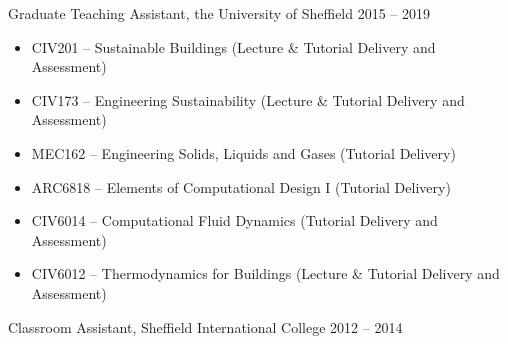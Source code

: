 \documentclass[10pt]{article}
\renewcommand{\section}[1]{\pagebreak[3]%
    \vspace{1.3\baselineskip}%
    \phantomsection\addcontentsline{toc}{section}{#1}%
    \noindent\llap{\large\smash{\parbox[t]{\marginparwidth}{\raggedright #1}}}%
    \vspace{-\baselineskip}\par}
\newenvironment{innerlist}[1][\enskip\textbullet]%
        {\begin{itemize}[#1,leftmargin=*,parsep=0pt,itemsep=0pt,topsep=0pt,partopsep=0pt]}
        {\end{itemize}}
\newcommand{\blankline}{\quad\pagebreak[3]}
\begin{document}
Graduate Teaching Assistant, the University of Sheffield \hfill {2015 -- 2019}
\begin{innerlist}[topsep=0ex]
	\item[] CIV201 -- Sustainable Buildings (Lecture \& Tutorial Delivery and Assessment)
	\item[] CIV173 -- Engineering Sustainability (Lecture \& Tutorial Delivery and Assessment)
	\item[] MEC162 -- Engineering Solids, Liquids and Gases (Tutorial Delivery)
	\item[] ARC6818 -- Elements of Computational Design I (Tutorial Delivery)
	\item[] CIV6014 -- Computational Fluid Dynamics (Tutorial Delivery and Assessment)
	\item[] CIV6012 -- Thermodynamics for Buildings (Lecture \& Tutorial Delivery and Assessment)
\end{innerlist}

\blankline

Classroom Assistant, Sheffield International College \hfill {2012 -- 2014}
\begin{innerlist}[topsep=0ex]
\end{innerlist}

\end{document}
